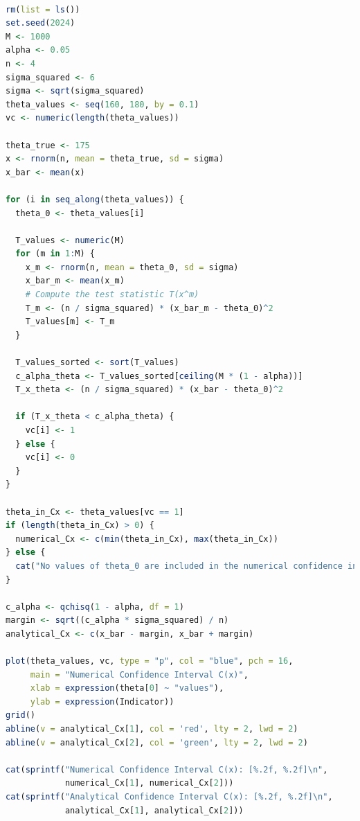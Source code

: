 \documentclass[a4paper,12pt]{article} %
\theoremstyle{nonitalic}
\newenvironment{solution}[1]
  {\renewcommand\theinnercustomsol{#1}\innercustomsol}
  {\endinnercustomsol}
\newcounter{solutionctr}
\renewcommand{\thesolutionctr}{(\alph{solutionctr})}
\newenvironment{autosolution}
  {\stepcounter{solutionctr}\begin{solution}{\thesolutionctr}}
  {\end{solution}}
\begin{document}
\begin{autosolution}
    \ 

\begin{lstlisting}[language=R]
rm(list = ls())
set.seed(2024)
M <- 1000 
alpha <- 0.05
n <- 4
sigma_squared <- 6
sigma <- sqrt(sigma_squared)
theta_values <- seq(160, 180, by = 0.1)
vc <- numeric(length(theta_values))

theta_true <- 175
x <- rnorm(n, mean = theta_true, sd = sigma)
x_bar <- mean(x)

for (i in seq_along(theta_values)) {
  theta_0 <- theta_values[i]
  
  T_values <- numeric(M)
  for (m in 1:M) {
    x_m <- rnorm(n, mean = theta_0, sd = sigma)
    x_bar_m <- mean(x_m)
    # Compute the test statistic T(x^m)
    T_m <- (n / sigma_squared) * (x_bar_m - theta_0)^2
    T_values[m] <- T_m
  }
  
  T_values_sorted <- sort(T_values)
  c_alpha_theta <- T_values_sorted[ceiling(M * (1 - alpha))]
  T_x_theta <- (n / sigma_squared) * (x_bar - theta_0)^2

  if (T_x_theta < c_alpha_theta) {
    vc[i] <- 1
  } else {
    vc[i] <- 0
  }
}

theta_in_Cx <- theta_values[vc == 1]
if (length(theta_in_Cx) > 0) {
  numerical_Cx <- c(min(theta_in_Cx), max(theta_in_Cx))
} else {
  cat("No values of theta_0 are included in the numerical confidence interval C(x).\n")
}

c_alpha <- qchisq(1 - alpha, df = 1)
margin <- sqrt((c_alpha * sigma_squared) / n)
analytical_Cx <- c(x_bar - margin, x_bar + margin)

plot(theta_values, vc, type = "p", col = "blue", pch = 16,
     main = "Numerical Confidence Interval C(x)",
     xlab = expression(theta[0] ~ "values"),
     ylab = expression(Indicator))
grid()
abline(v = analytical_Cx[1], col = 'red', lty = 2, lwd = 2)
abline(v = analytical_Cx[2], col = 'green', lty = 2, lwd = 2)

cat(sprintf("Numerical Confidence Interval C(x): [%.2f, %.2f]\n",
            numerical_Cx[1], numerical_Cx[2]))
cat(sprintf("Analytical Confidence Interval C(x): [%.2f, %.2f]\n",
            analytical_Cx[1], analytical_Cx[2]))
\end{lstlisting}


\end{autosolution}
\end{document}
